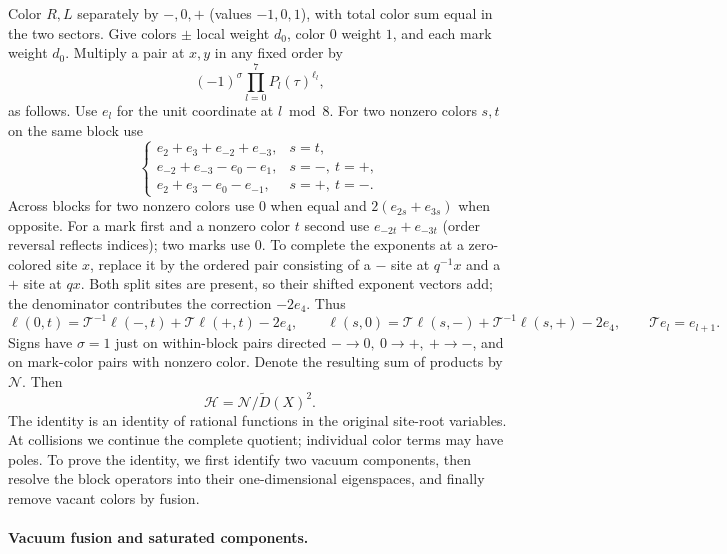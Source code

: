 Color \(R,L\) separately by \(-,0,+\) (values \(-1,0,1\)), with total color sum equal in the two sectors. Give colors \(\pm\) local weight \(d_0\), color 0 weight \(1\), and each mark weight \(d_0\). Multiply a pair at \(x,y\) in any fixed order by
\[
          (-1)^\sigma\prod_{l=0}^7 P_l(\tau)^{\ell_l},
\]
as follows. Use \(e_l\) for the unit coordinate at \(l\bmod 8\). For two nonzero colors \(s,t\) on the same block use
\[
 \begin{cases}
 e_2+e_3+e_{-2}+e_{-3},&s=t,\\
 e_{-2}+e_{-3}-e_0-e_1,&s=-,\ t=+,\\
 e_2+e_3-e_0-e_{-1},&s=+,\ t=-.
 \end{cases}
\]
Across blocks for two nonzero colors use \(0\) when equal and \(2(e_{2s}+e_{3s})\) when opposite. For a mark first and a nonzero color \(t\) second use \(e_{-2t}+e_{-3t}\) (order reversal reflects indices); two marks use 0. To complete the exponents at a zero-colored site \(x\), replace it by the ordered pair consisting of a \(-\) site at \(q^{-1}x\) and a \(+\) site at \(qx\). Both split sites are present, so their shifted exponent vectors add; the denominator contributes the correction \(-2e_4\). Thus
\[
 \ell(0,t)=\mathcal T^{-1}\ell(-,t)+\mathcal T\ell(+,t)-2e_4,\qquad
 \ell(s,0)=\mathcal T\ell(s,-)+\mathcal T^{-1}\ell(s,+)-2e_4,\qquad \mathcal T e_l=e_{l+1}.
\]
Signs have \(\sigma=1\) just on within-block pairs directed \(-\to0,\ 0\to+,\ +\to-\), and on mark-color pairs with nonzero color. Denote the resulting sum of products by \(\mathscr N\). Then
\begin{equation}
                          \mathscr H=\mathscr N/\widetilde D(X)^2.                  \label{c4:Pair-sum}
\end{equation}
The identity is an identity of rational functions in the original
site-root variables.  At collisions we continue the complete quotient;
individual color terms may have poles.  To prove the identity, we first
identify two vacuum components, then resolve the block operators into
their one-dimensional eigenspaces, and finally remove vacant colors by
fusion.

\paragraph{Vacuum fusion and saturated components.}

